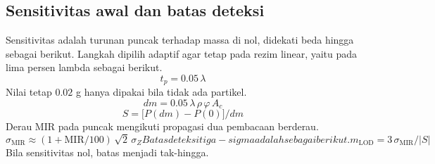 \documentclass[a4paper,11pt]{article}
\begin{document}
\subsection{Sensitivitas awal dan batas deteksi}
Sensitivitas adalah turunan puncak terhadap massa di nol,
didekati beda hingga sebagai berikut. Langkah dipilih adaptif
agar tetap pada rezim linear, yaitu pada lima persen lambda sebagai berikut.
\begin{equation*}
t_{p} = 0.05\,\lambda
\end{equation*}
Nilai tetap $0.02$ g hanya dipakai bila tidak ada partikel.
\begin{equation*}
dm = 0.05\,\lambda\,\rho\,\varphi\,A_{c}
\end{equation*}
\begin{equation*}
S = \bigl[P(dm)-P(0)\bigr]/dm
\end{equation*}
Derau MIR pada puncak mengikuti propagasi dua pembacaan berderau.
\begin{subequations}\label{eq:23}
\begin{equation}
\sigma_{\mathrm{MIR}} \approx (1+\mathrm{MIR}/100)\,\sqrt{2}\,\sigma_{Z}
\label{eq:23a}
\end{equation}
Batas deteksi tiga-sigma adalah sebagai berikut.
\begin{equation}
m_{\mathrm{LOD}} = 3\,\sigma_{\mathrm{MIR}}/|S|
\label{eq:23b}
\end{equation}
\end{subequations}
Bila sensitivitas nol, batas menjadi tak-hingga.
\end{document}
